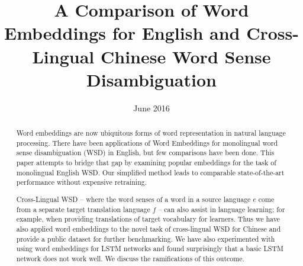 \documentclass[11pt]{article}
\title{A Comparison of Word Embeddings for English and Cross-Lingual Chinese Word Sense Disambiguation}
\date{June 2016}
\begin{document}
\maketitle
  

\begin{abstract}
Word embeddings are now ubiquitous forms of word representation in
natural language processing.  There have been applications of Word
Embeddings for monolingual word sense disambiguation (WSD) in English,
but few comparisons have been done.  This paper attempts to bridge
that gap by examining popular embeddings for the task of monolingual
English WSD.  Our simplified method leads to comparable
state-of-the-art performance without expensive retraining.

Cross-Lingual WSD -- where the word senses of a word in a source
language $e$ come from a separate target translation language $f$ --
can also assist in language learning; for example, when providing
translations of target vocabulary for learners.  Thus we have also
applied word embeddings to the novel task of cross-lingual WSD for
Chinese and provide a public dataset for further benchmarking.
We have also experimented with using word embeddings for LSTM networks
and found surprisingly that a basic LSTM network does not work well.
We discuss the ramifications of this outcome.
\end{abstract}









\end{document}
